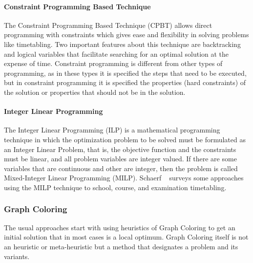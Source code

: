 \paragraph{Constraint Programming Based Technique}
The Constraint Programming Based Technique (CPBT) allows direct programming with constraints which gives ease and flexibility in solving problems like timetabling. Two important features about this technique are backtracking and logical variables that facilitate searching for an optimal solution at the expense of time. Constraint programming is different from other types of programming, as in these types it is specified the steps that need to be executed, but in constraint programming it is specified the properties (hard constraints) of the solution or properties that should not be in the solution. ~\cite{Qu2009}\\

\paragraph{Integer Linear Programming}
The Integer Linear Programming (ILP) is a mathematical programming technique in which the optimization problem to be solved must be formulated as an Integer Linear Problem, that is, the objective function and the constraints must be linear, and all problem variables are integer valued. If there are some variables that are continuous and other are integer, then the problem is called Mixed-Integer Linear Programming (MILP). Schaerf ~\cite{Schaerf1999} surveys some approaches using the MILP technique to school, course, and examination timetabling.

\subsubsection{Graph Coloring}
\label{subsection:graphcoloring}
The usual approaches start with using heuristics of Graph Coloring to get an initial solution that in most cases is a local optimum. Graph Coloring itself is not an heuristic or meta-heuristic but a method that designates a problem and its variants.\\

